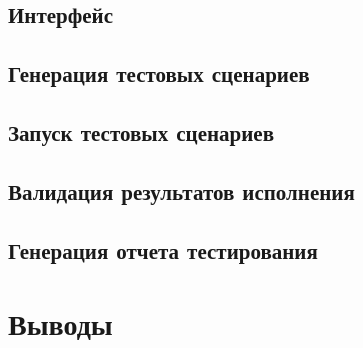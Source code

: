 \documentclass[14pt, openany]{book}
\begin{document}
\section{Интерфейс}

\section{Генерация тестовых сценариев}

\section{Запуск тестовых сценариев}

\section{Валидация результатов исполнения}

\section{Генерация отчета тестирования}

\chapter{Выводы}



\end{document}
